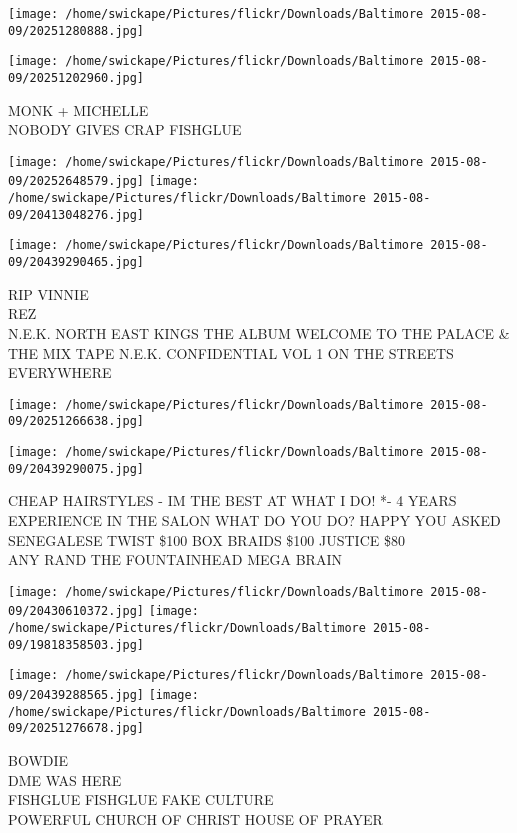 \documentclass[10pt,letterpaper]{article}
\begin{document}
\texttt{[image: /home/swickape/Pictures/flickr/Downloads/Baltimore 2015-08-09/20251280888.jpg]}

\vspace{0.25in}
\texttt{[image: /home/swickape/Pictures/flickr/Downloads/Baltimore 2015-08-09/20251202960.jpg]}

MONK + MICHELLE\\
NOBODY GIVES CRAP FISHGLUE
\pagebreak

\texttt{[image: /home/swickape/Pictures/flickr/Downloads/Baltimore 2015-08-09/20252648579.jpg]}
\texttt{[image: /home/swickape/Pictures/flickr/Downloads/Baltimore 2015-08-09/20413048276.jpg]}

\vspace{0.25in}
\texttt{[image: /home/swickape/Pictures/flickr/Downloads/Baltimore 2015-08-09/20439290465.jpg]}

RIP VINNIE\\
REZ\\
N.E.K. NORTH EAST KINGS THE ALBUM WELCOME TO THE PALACE \& THE MIX TAPE N.E.K. CONFIDENTIAL VOL 1 ON THE STREETS EVERYWHERE
\pagebreak

\texttt{[image: /home/swickape/Pictures/flickr/Downloads/Baltimore 2015-08-09/20251266638.jpg]}

\vspace{0.25in}
\texttt{[image: /home/swickape/Pictures/flickr/Downloads/Baltimore 2015-08-09/20439290075.jpg]}

CHEAP HAIRSTYLES {-} IM THE BEST AT WHAT I DO!  *{-} 4 YEARS EXPERIENCE IN THE SALON WHAT DO YOU DO?  HAPPY YOU ASKED SENEGALESE TWIST \$100 BOX BRAIDS \$100 JUSTICE \$80\\
ANY RAND THE FOUNTAINHEAD MEGA BRAIN
\pagebreak

\texttt{[image: /home/swickape/Pictures/flickr/Downloads/Baltimore 2015-08-09/20430610372.jpg]}
\texttt{[image: /home/swickape/Pictures/flickr/Downloads/Baltimore 2015-08-09/19818358503.jpg]}

\texttt{[image: /home/swickape/Pictures/flickr/Downloads/Baltimore 2015-08-09/20439288565.jpg]}
\texttt{[image: /home/swickape/Pictures/flickr/Downloads/Baltimore 2015-08-09/20251276678.jpg]}

BOWDIE\\
DME WAS HERE\\
FISHGLUE FISHGLUE FAKE CULTURE\\
POWERFUL CHURCH OF CHRIST HOUSE OF PRAYER
\pagebreak
\end{document}
